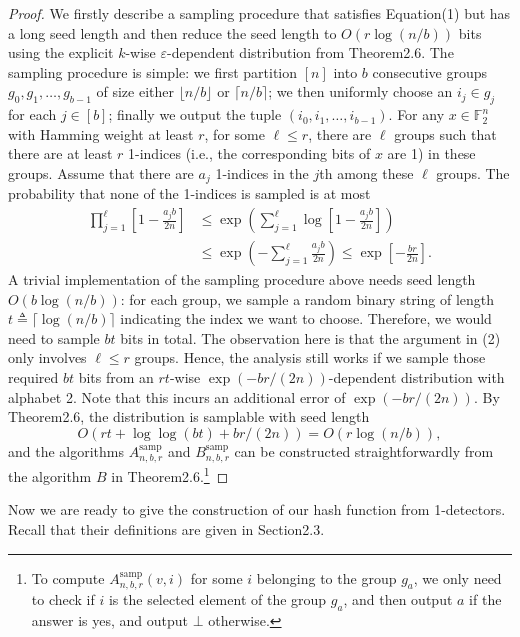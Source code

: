 \documentclass[10pt,a4paper]{article}
\begin{document}
\begin{proof}
We firstly describe a sampling procedure that satisfies Equation(1) but has a long seed length and then reduce the seed length to $O(r\log(n/b))$ bits using the explicit $k$-wise $\varepsilon$-dependent distribution from Theorem2.6. The sampling procedure is simple: we first partition $[n]$ into $b$ consecutive groups $g_0,g_1,\ldots,g_{b-1}$ of size either $\lfloor n/b\rfloor$ or $\lceil n/b\rceil$; we then uniformly choose an $i_j\in g_j$ for each $j\in[b]$; finally we output the tuple $(i_0,i_1,\ldots,i_{b-1})$.
For any $x\in\mathbb F_2^n$ with Hamming weight at least $r$, for some $\ell\le r$, there are $\ell$ groups such that there are at least $r$ 1-indices (i.e., the corresponding bits of $x$ are 1) in these groups. Assume that there are $a_j$ 1-indices in the $j$th among these $\ell$ groups. The probability that none of the 1-indices is sampled is at most
\begin{equation}\tag{2}
\begin{aligned}
\prod_{j=1}^\ell\left[1-\frac{a_jb}{2n}\right]
&\le\exp\left(\sum_{j=1}^\ell\log\left[1-\frac{a_jb}{2n}\right]\right)\\
&\le\exp\left(-\sum_{j=1}^\ell\frac{a_jb}{2n}\right)\le\exp\left[-\frac{br}{2n}\right].
\end{aligned}
\end{equation}
A trivial implementation of the sampling procedure above needs seed length $O(b\log(n/b))$: for each group, we sample a random binary string of length $t\triangleq\lceil\log(n/b)\rceil$ indicating the index we want to choose. Therefore, we would need to sample $bt$ bits in total. The observation here is that the argument in (2) only involves $\ell\le r$ groups. Hence, the analysis still works if we sample those required $bt$ bits from an $rt$-wise $\exp(-br/(2n))$-dependent distribution with alphabet 2. Note that this incurs an additional error of $\exp(-br/(2n))$.
By Theorem2.6, the distribution is samplable with seed length
\[O(rt+\log\log(bt)+br/(2n))=O(r\log(n/b)),\]
and the algorithms $A^{\mathrm{samp}}_{n,b,r}$ and $B^{\mathrm{samp}}_{n,b,r}$ can be constructed straightforwardly from the algorithm $B$ in Theorem2.6.\footnote{To compute $A^{\mathrm{samp}}_{n,b,r}(v,i)$ for some $i$ belonging to the group $g_a$, we only need to check if $i$ is the selected element of the group $g_a$, and then output $a$ if the answer is yes, and output $\bot$ otherwise.}
\end{proof}
Now we are ready to give the construction of our hash function from 1-detectors. Recall that their definitions are given in Section2.3.
\end{document}
